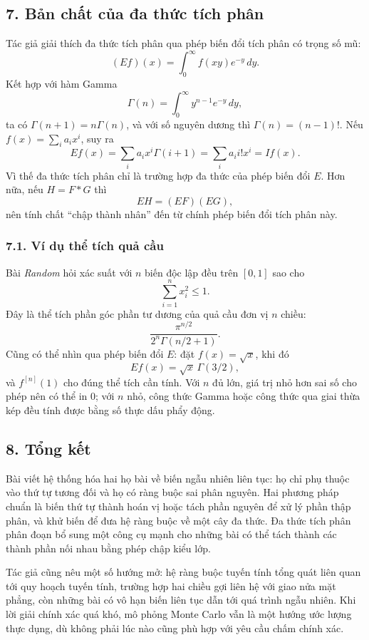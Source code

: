 \documentclass[11pt]{article}
\begin{document}
\subsection*{7. Bản chất của đa thức tích phân}

Tác giả giải thích đa thức tích phân qua phép biến đổi tích phân có trọng số
mũ:
\[
  (Ef)(x)=\int_{0}^{\infty} f(xy)e^{-y}\,dy.
\]
Kết hợp với hàm Gamma
\[
  \Gamma(n)=\int_{0}^{\infty} y^{n-1}e^{-y}\,dy,
\]
ta có \(\Gamma(n+1)=n\Gamma(n)\), và với số nguyên dương thì
\(\Gamma(n)=(n-1)!\). Nếu \(f(x)=\sum_i a_i x^i\), suy ra
\[
  Ef(x)=\sum_i a_i x^i\Gamma(i+1)=\sum_i a_i i!x^i=If(x).
\]
Vì thế đa thức tích phân chỉ là trường hợp đa thức của phép biến đổi \(E\).
Hơn nữa, nếu \(H=F*G\) thì
\[
  EH=(EF)(EG),
\]
nên tính chất ``chập thành nhân'' đến từ chính phép biến đổi tích phân này.

\subsubsection*{7.1. Ví dụ thể tích quả cầu}

Bài \emph{Random} hỏi xác suất với \(n\) biến độc lập đều trên \([0,1]\) sao
cho
\[
  \sum_{i=1}^{n} x_i^2\le 1.
\]
Đây là thể tích phần góc phần tư dương của quả cầu đơn vị \(n\) chiều:
\[
  \frac{\pi^{n/2}}{2^n\Gamma(n/2+1)}.
\]
Cũng có thể nhìn qua phép biến đổi \(E\): đặt \(f(x)=\sqrt{x}\), khi đó
\[
  Ef(x)=\sqrt{x}\,\Gamma(3/2),
\]
và \(f^{[n]}(1)\) cho đúng thể tích cần tính. Với \(n\) đủ lớn, giá trị nhỏ hơn
sai số cho phép nên có thể in \(0\); với \(n\) nhỏ, công thức Gamma hoặc công
thức qua giai thừa kép đều tính được bằng số thực dấu phẩy động.

\subsection*{8. Tổng kết}

Bài viết hệ thống hóa hai họ bài về biến ngẫu nhiên liên tục: họ chỉ phụ thuộc
vào thứ tự tương đối và họ có ràng buộc sai phân nguyên. Hai phương pháp chuẩn
là biến thứ tự thành hoán vị hoặc tách phần nguyên để xử lý phần thập phân, và
khử biến để đưa hệ ràng buộc về một cây đa thức. Đa thức tích phân phân đoạn
bổ sung một công cụ mạnh cho những bài có thể tách thành các thành phần nối
nhau bằng phép chập kiểu lớp.

Tác giả cũng nêu một số hướng mở: hệ ràng buộc tuyến tính tổng quát liên quan
tới quy hoạch tuyến tính, trường hợp hai chiều gợi liên hệ với giao nửa mặt
phẳng, còn những bài có vô hạn biến liên tục dẫn tới quá trình ngẫu nhiên. Khi
lời giải chính xác quá khó, mô phỏng Monte Carlo vẫn là một hướng ước lượng
thực dụng, dù không phải lúc nào cũng phù hợp với yêu cầu chấm chính xác.
\end{document}
